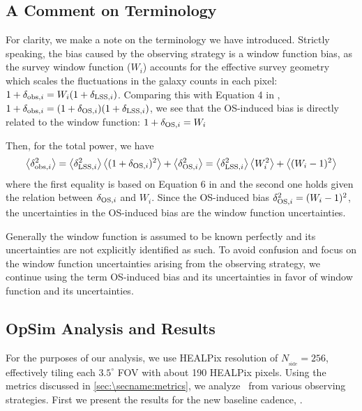 \subsection{A Comment on Terminology}
For clarity, we make a note on the terminology we have introduced. Strictly speaking, the bias caused by the observing strategy is a window function bias, as the survey window function ($W_i$) accounts for the effective survey geometry which scales the fluctuations in the galaxy counts in each pixel: $1+\delta_{\mathrm{obs},i}= W_i(1+\delta_{\mathrm{LSS},i})$. Comparing this with Equation 4 in \citet{AwanEtal2016}, $1+\delta_{\mathrm{obs},i}= (1+\delta_{\mathrm{OS},i})(1+\delta_{\mathrm{LSS},i})$, we see that the OS-induced bias is directly related to the window function: $1 + \delta_{\mathrm{OS},i}= W_i$

Then, for the total power, we have
\begin{equation}
\left < {\delta_{\mathrm{obs},i}^2} \right >=\left < {\delta_{\mathrm{LSS},i}^2} \right >\left < {(1 + \delta_{\mathrm{OS},i})^2} \right >+ \left < {\delta_{\mathrm{OS},i}^2} \right >=\left < {\delta_{\mathrm{LSS},i}^2} \right >\left < {W_i^2} \right >+ \left < {(W_i-1)^2} \right >
\end{equation}
where the first equality is based on Equation 6 in \citet{AwanEtal2016} and the second one holds given the relation between $\delta_{\mathrm{OS},i}$ and $W_i$. Since the OS-induced bias $\delta_{\mathrm{OS},i}^2=  (W_i-1)^2$, the uncertainties in the OS-induced bias are the window function uncertainties.

Generally the window function is assumed to be known perfectly and its uncertainties are not explicitly identified as such. To avoid confusion and focus on the window function uncertainties arising from the observing strategy, we continue using the term OS-induced bias and its uncertainties in favor of window function and its uncertainties.

\subsection{OpSim Analysis and Results}
\label{sec:\secname: analysis}
For the purposes of our analysis, we use HEALPix resolution of $N_\mathrm{_{side}}= 256$, effectively tiling each $3.5^\circ$ FOV with about 190 HEALPix pixels. Using the metrics discussed in \autoref{sec:\secname:metrics}, we analyze \sigmaOS\ from various observing strategies. First we present the results for the new baseline cadence, .

